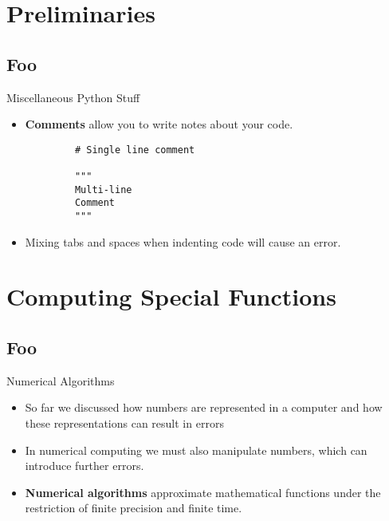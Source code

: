 \documentclass[serif,xcolor=pdftex,dvipsnames,table,hyperref={bookmarks=false,breaklinks}]{beamer}
\begin{document}
\maketitlepage

\section{Preliminaries}
\subsection{Foo}



\begin{frame}[t,fragile]{Miscellaneous Python Stuff}
	\begin{itemize}[<+->]
		\item \textbf{Comments} allow you to write notes about your code.
	\end{itemize}
	\pause
	\begin{tcolorbox}
		\begin{verbatim}
			# Single line comment
			
			"""
			Multi-line
			Comment
			"""
		\end{verbatim}
	\end{tcolorbox}
	\pause
	\begin{itemize}[<+->]
		\item Mixing tabs and spaces when indenting code will cause an error.
	\end{itemize}
\end{frame}

\section{Computing Special Functions}
\subsection{Foo}

\begin{frame}[t]{Numerical Algorithms}
	\begin{itemize}[<+->]		
		\item So far we discussed how numbers are represented in a computer and how these representations can result in errors
		\item In numerical computing we must also manipulate numbers, which can introduce further errors. 
		\item \textbf{Numerical algorithms} approximate mathematical functions under the restriction of finite precision and finite time.
	\end{itemize}
\end{frame}
\end{document}
